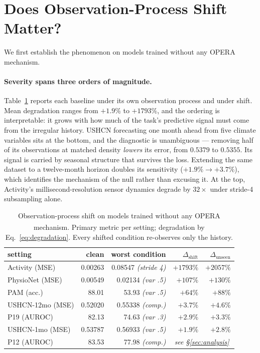 \documentclass[sigconf,nonacm]{acmart}
\newcommand{\prelim}{\textsuperscript{\dag}}
\begin{document}
\section{Does Observation-Process Shift Matter?}
\label{sec:phenomenon}
We first establish the phenomenon on models trained without any OPERA mechanism.

\paragraph{Severity spans three orders of magnitude.}
Table~\ref{tab:phenomenon} reports each baseline under its own observation process and under shift. Mean
degradation ranges from $+1.9\%$ to $+1793\%$, and the ordering is interpretable: it grows with how much of the
task's predictive signal must come from the irregular history. USHCN forecasting one month ahead from five
climate variables sits at the bottom, and the diagnostic is unambiguous --- removing half of its observations at
matched density \emph{lowers} its error, from $0.5379$ to $0.5355$. Its signal is carried by seasonal structure
that survives the loss. Extending the same dataset to a twelve-month horizon doubles its sensitivity
($+1.9\%\to+3.7\%$), which identifies the mechanism of the null rather than excusing it. At the top, Activity's
millisecond-resolution sensor dynamics degrade by $32\times$ under stride-4 subsampling alone.

\begin{table}[t]
\caption{Observation-process shift on models trained without any OPERA mechanism\prelim. Primary metric per
setting; degradation by Eq.~\ref{eq:degradation}. Every shifted condition re-observes only the history.}
\label{tab:phenomenon}
\small
\begin{tabular}{lrrrr}
\toprule
setting & clean & worst condition & $\Delta_{\mathrm{shift}}$ & $\Delta_{\mathrm{unseen}}$ \\
\midrule
Activity (MSE) & 0.00263 & 0.08547 \textit{(stride 4)} & $+1793\%$ & $+2057\%$ \\
PhysioNet (MSE) & 0.00549 & 0.02134 \textit{(var .5)} & $+107\%$ & $+130\%$ \\
PAM (acc.) & 88.01 & 53.93 \textit{(var .5)} & $+64\%$ & $+88\%$ \\
USHCN-12mo (MSE) & 0.52020 & 0.55338 \textit{(comp.)} & $+3.7\%$ & $+4.6\%$ \\
P19 (AUROC) & 82.13 & 74.63 \textit{(var .3)} & $+2.9\%$ & $+3.3\%$ \\
USHCN-1mo (MSE) & 0.53787 & 0.56933 \textit{(var .5)} & $+1.9\%$ & $+2.8\%$ \\
P12 (AUROC) & 83.53 & 77.98 \textit{(comp.)} & \multicolumn{2}{c}{\textit{see \S\ref{sec:analysis}}} \\
\bottomrule
\end{tabular}
\end{table}
\end{document}
